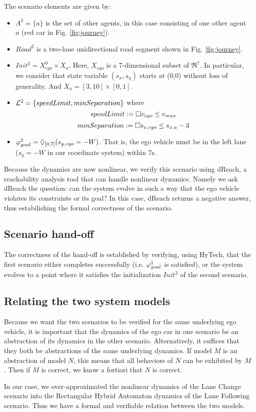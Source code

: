 The scenario elements are given by:
\begin{itemize}
	\item $A^2 = \{a\}$ is the set of other agents, in this case consisting of one other agent $a$ (red car in Fig. \ref{fig:journey}).
	\item $Road^2$ is a two-lane unidirectional road segment shown in Fig. \ref{fig:journey}.
	\item $Init^2 = X_{ego}^0 \times X_a$. 
	Here, $X_{ego}$ is a 7-dimensional subset of $\Re^7$.
	In particular, we consider that state variable $(s_x,s_y)$ starts at (0,0) without loss of generality. And 
	$X_a = [3,10] \times [0,1]$.
	\item $\mathcal{L}^2 = \{speedLimit, minSeparation\}$ where
	\[speedLimit := \square v_{ego} \leq v_{max}\]
	\[minSeparation := \square s_{x,ego} \leq s_{x,a} - 3\]
	\item $\varphi_{goal}^2 = \Diamond_{[0,7]}(s_{y,ego} = -W)$.
	That is, the ego vehicle must be in the left lane ($s_y = -W$ in our coordinate system) within 7s.
\end{itemize}

Because the dynamics are now nonlinear, we verify this scenario using dReach, a reachability analysis tool that can handle nonlinear dynamics.
Namely we ask dReach the question: can the system evolve in such a way that the ego vehicle violates its constraints or its goal? 
In this case, dReach returns a negative answer, thus estabilishing the formal correctness of the scenario.

\subsection{Scenario hand-off}
The correctness of the hand-off is established by verifying, using HyTech, that the first scenario either completes successfully (i.e. $\varphi_{goal}^1$ is satisfied), or the system evolves to a point where it satisfies the initialization $Init^2$ of the second scenario.

\subsection{Relating the two system models}
\label{sec:relating-the-two-system-models}
Because we want the two scenarios to be verified for the same underlying ego vehicle, it is important that the dynamics of the ego car in one scenario be an abstraction of its dynamics in the other scenario.
Alternatively, it suffices that they both be abstractions of the same underlying dynamics.
If model $M$ is an abstraction of model $N$, this means that all behaviors of $N$ can be exhibited by $M$. 
Then if $M$ is correct, we know a fortiori that $N$ is correct.

In our case, we over-approximated the nonlinear dynamics of the Lane Change scenario into the Rectangular Hybrid Automaton dynamics of the Lane Following scenario.
Thus we have a formal and verifiable relation between the two models.
